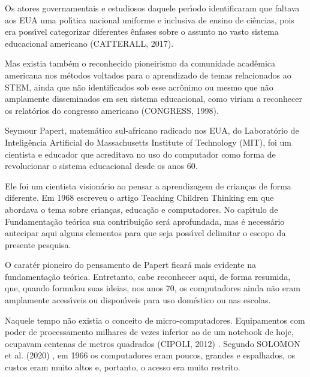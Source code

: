 \documentclass[
12pt,		%
openright,	%
twoside,  %
a4paper,			%
chapter=TITLE,		%
english,			%
french,				%
spanish,			%
brazil				%
]{USPSC-classe/USPSC}
\begin{document}
Os atores governamentais e estudiosos daquele per\'{\i}odo identificaram que faltava aos EUA uma pol\'{\i}tica nacional uniforme e inclusiva de ensino de ci\^encias, pois era poss\'{\i}vel categorizar diferentes \^enfases sobre o assunto no vasto sistema educacional americano  (CATTERALL, 2017).




Mas existia tamb\'em o reconhecido pioneirismo da comunidade acad\^emica americana nos m\'etodos voltados para o aprendizado de temas relacionados ao STEM, ainda que n\~ao identificados sob esse acr\^onimo ou mesmo que n\~ao amplamente disseminados em seu sistema educacional, como viriam a reconhecer os relat\'orios do congresso americano  (CONGRESS, 1998).




Seymour Papert, matem\'atico sul-africano radicado nos EUA, do Laborat\'orio de Intelig\^encia Artificial do Massachusetts Institute of Technology (MIT), foi um  cientista e educador que acreditava  no  uso do computador como forma de revolucionar o sistema  educacional  desde os anos 60.




Ele foi um cientista vision\'ario ao pensar a aprendizagem de crian\c{c}as de forma diferente. Em 1968 escreveu o artigo \textquotedbl  Teaching Children Thinking \textquotedbl   em que abordava  o tema sobre crian\c{c}as, educa\c{c}\~ao e computadores. No cap\'{\i}tulo de Fundamenta\c{c}\~ao te\'orica sua contribui\c{c}\~ao ser\'a aprofundada, mas \'e necess\'ario antecipar aqui alguns elementos para que seja poss\'{\i}vel delimitar o escopo da presente pesquisa.




O carat\'er pioneiro do pensamento de Papert ficar\'a mais evidente na fundamenta\c{c}\~ao te\'orica. Entretanto, cabe reconhecer aqui, de forma resumida, que, quando formulou suas ideias, nos anos 70, os computadores  ainda n\~ao eram amplamente acess\'{\i}veis ou dispon\'{\i}veis para uso dom\'estico ou nas escolas.




Naquele tempo n\~ao existia o conceito de \textquotedbl micro-computadores\textquotedbl . Equipamentos com poder de processamento milhares de vezes inferior ao de um notebook de hoje, ocupavam centenas de metros quadrados  (CIPOLI, 2012) . Segundo  SOLOMON et al. (2020) , \textquotedbl em 1966 os computadores eram poucos, grandes e espalhados\textquotedbl , os custos eram muito altos e, portanto, o acesso era muito restrito.
\end{document}
